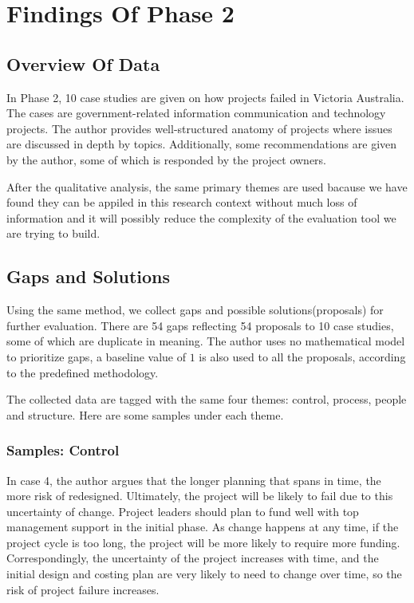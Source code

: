
\section{Findings Of Phase 2}

\subsection{Overview Of Data}
In Phase 2, 10 case studies are given on how projects failed in Victoria Australia. The cases are government-related information communication and technology projects. The author\parencite{case_study} provides well-structured anatomy of projects where issues are discussed in depth by topics. Additionally, some recommendations are given by the author, some of which is responded by the project owners.

After the qualitative analysis, the same primary themes are used bacause we have found they can be appiled in this research context without much loss of information and it will possibly reduce the complexity of the evaluation tool we are trying to build. 

\subsection{Gaps and Solutions}
Using the same method, we collect gaps and possible solutions(proposals) for further evaluation. There are 54 gaps reflecting 54 proposals to 10 case studies, some of which are duplicate in meaning. The author uses no mathematical model to prioritize gaps, a baseline value of $1$ is also used to all the proposals, according to the predefined methodology.

The collected data are tagged with the same four themes: control, process, people and structure. Here are some samples under each theme.

\subsubsection{Samples: Control}
In case 4, the author argues that the longer planning that spans in time, the more risk of redesigned. Ultimately, the project will be likely to fail due to this uncertainty of change. Project leaders should plan to fund well with top management support in the initial phase. As change happens at any time, if the project cycle is too long, the project will be more likely to require more funding. Correspondingly, the uncertainty of the project increases with time, and the initial design and costing plan are very likely to need to change over time, so the risk of project failure increases.


